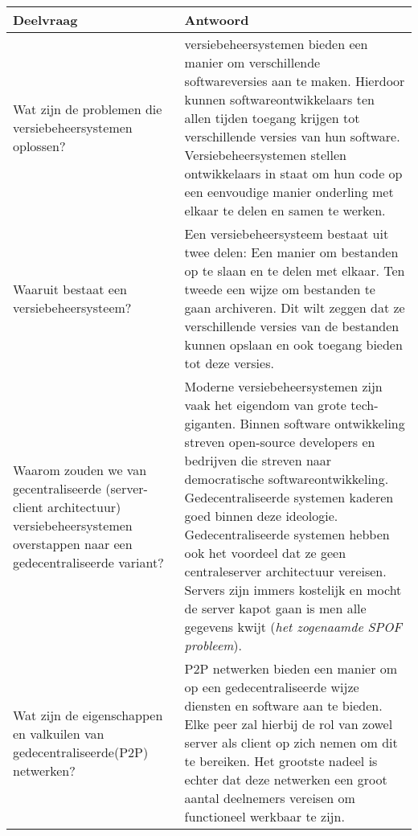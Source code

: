 \begin{table}[h!]
\begin{tabularx}{\linewidth}{ |X|X| }
\hline
Deelvraag & Antwoord \\ \hline
Wat zijn de problemen die versiebeheersystemen oplossen? & 
versiebeheersystemen bieden een manier om verschillende softwareversies aan te maken. Hierdoor kunnen softwareontwikkelaars ten allen tijden toegang krijgen tot verschillende versies van hun software. Versiebeheersystemen stellen ontwikkelaars in staat om hun code op een eenvoudige manier onderling met elkaar te delen en samen te werken.\\ \hline
Waaruit bestaat een versiebeheersysteem? & Een versiebeheersysteem bestaat uit twee delen: Een manier om bestanden op te slaan en te delen met elkaar. Ten tweede een wijze om bestanden te gaan archiveren. Dit wilt zeggen dat ze verschillende versies van de bestanden kunnen opslaan en ook toegang bieden tot deze versies.\\ \hline
Waarom zouden we van gecentraliseerde (server-client architectuur) versiebeheersystemen overstappen naar een gedecentraliseerde variant?         & Moderne versiebeheersystemen zijn vaak het eigendom van grote tech-giganten. Binnen software ontwikkeling streven open-source developers en bedrijven die streven naar democratische softwareontwikkeling. Gedecentraliseerde systemen kaderen goed binnen deze ideologie. Gedecentraliseerde systemen hebben ook het voordeel dat ze geen centraleserver architectuur vereisen. Servers zijn immers kostelijk en mocht de server kapot gaan is men alle gegevens kwijt (\textit{het zogenaamde SPOF probleem}).\\ \hline
Wat zijn de eigenschappen en valkuilen van gedecentraliseerde(P2P) netwerken? & P2P netwerken bieden een manier om op een gedecentraliseerde wijze diensten en software aan te bieden. Elke peer zal hierbij de rol van zowel server als client op zich nemen om dit te bereiken. Het grootste nadeel is echter dat deze netwerken een groot aantal deelnemers vereisen om functioneel werkbaar te zijn.\\ \hline
\end{tabularx}
\end{table} 
\newpage
\newpage
